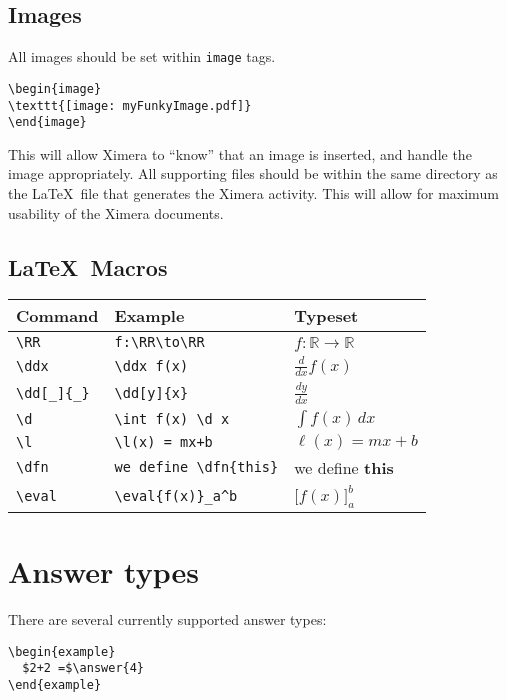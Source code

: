 \documentclass{article}
\newcommand{\RR}{\mathbb R}
\renewcommand{\d}{\,d}
\newcommand{\dd}[2][]{\frac{d #1}{d #2}}
\renewcommand{\l}{\ell}
\newcommand{\ddx}{\frac{d}{dx}}
\newcommand{\dfn}{\textbf}
\newcommand{\eval}[1]{\bigg[ #1 \bigg]}
\begin{document}
\subsection*{Images}

All images should be set within \verb|image| tags.
\begin{verbatim}
\begin{image}
\texttt{[image: myFunkyImage.pdf]}
\end{image}
\end{verbatim}
This will allow Ximera to ``know'' that an image is inserted, and
handle the image appropriately. All supporting files should be within
the same directory as the \LaTeX\ file that generates the Ximera
activity. This will allow for maximum usability of the Ximera
documents.

\subsection*{\LaTeX\ Macros}

\renewcommand{\arraystretch}{2}
\begin{tabular*}{1.0\textwidth}{lll}
\hline
Command & Example & Typeset \\
\hline
\verb|\RR| & \verb|f:\RR\to\RR| & $f:\RR\to\RR$\\ 
\verb|\ddx| & \verb|\ddx f(x)| & $\ddx f(x)$\\
\verb|\dd[_]{_}| & \verb|\dd[y]{x}| & $\dd[y]{x}$ \\
\verb|\d | & \verb|\int f(x) \d x| & $\int f(x) \d x$\\
\verb|\l| & \verb|\l(x) = mx+b| & $\l(x) = mx +b$\\
\verb|\dfn| & \verb|we define \dfn{this}| & we define \dfn{this}\\
\verb|\eval| & \verb|\eval{f(x)}_a^b| & $\eval{f(x)}_a^b$
\end{tabular*}

\section{Answer types}

There are several currently supported answer types:

\begin{verbatim}
\begin{example}
  $2+2 =$\answer{4}
\end{example}
\end{verbatim}
\end{document}
